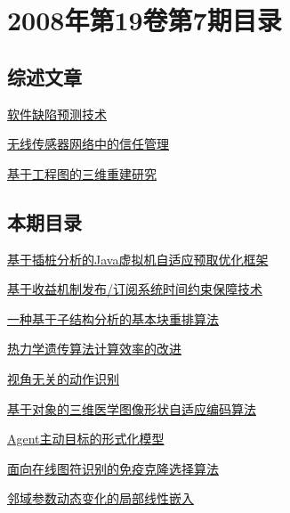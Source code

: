 \documentclass[a4paper]{article}
\begin{document}
\section{\textbf{2008年第19卷第7期目录}}
\subsection{综述文章}
\href{http://www.jos.org.cn/ch/reader/download_pdf.aspx?file_no=20080701&year_id=2008&quarter_id=7&falg=1}{软件缺陷预测技术}

\href{http://www.jos.org.cn/ch/reader/download_pdf.aspx?file_no=20080715&year_id=2008&quarter_id=7&falg=1}{无线传感器网络中的信任管理}

\href{http://www.jos.org.cn/ch/reader/download_pdf.aspx?file_no=20080722&year_id=2008&quarter_id=7&falg=1}{基于工程图的三维重建研究}

\subsection{本期目录}
\href{http://www.jos.org.cn/ch/reader/download_pdf.aspx?file_no=20080702&year_id=2008&quarter_id=7&falg=1}{基于插桩分析的Java虚拟机自适应预取优化框架}

\href{http://www.jos.org.cn/ch/reader/download_pdf.aspx?file_no=20080703&year_id=2008&quarter_id=7&falg=1}{基于收益机制发布/订阅系统时间约束保障技术}

\href{http://www.jos.org.cn/ch/reader/download_pdf.aspx?file_no=20080704&year_id=2008&quarter_id=7&falg=1}{一种基于子结构分析的基本块重排算法}

\href{http://www.jos.org.cn/ch/reader/download_pdf.aspx?file_no=20080705&year_id=2008&quarter_id=7&falg=1}{热力学遗传算法计算效率的改进}

\href{http://www.jos.org.cn/ch/reader/download_pdf.aspx?file_no=20080706&year_id=2008&quarter_id=7&falg=1}{视角无关的动作识别}

\href{http://www.jos.org.cn/ch/reader/download_pdf.aspx?file_no=20080707&year_id=2008&quarter_id=7&falg=1}{基于对象的三维医学图像形状自适应编码算法}

\href{http://www.jos.org.cn/ch/reader/download_pdf.aspx?file_no=20080708&year_id=2008&quarter_id=7&falg=1}{Agent主动目标的形式化模型}

\href{http://www.jos.org.cn/ch/reader/download_pdf.aspx?file_no=20080709&year_id=2008&quarter_id=7&falg=1}{面向在线图符识别的免疫克隆选择算法}

\href{http://www.jos.org.cn/ch/reader/download_pdf.aspx?file_no=20080710&year_id=2008&quarter_id=7&falg=1}{邻域参数动态变化的局部线性嵌入}
\end{document}
